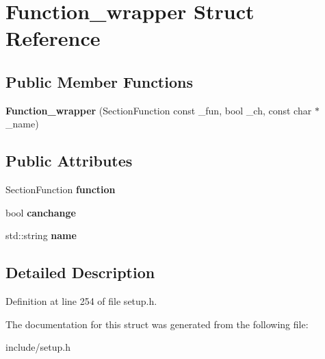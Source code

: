 \hypertarget{structFunction__wrapper}{\section{Function\-\_\-wrapper Struct Reference}
\label{structFunction__wrapper}
}
\subsection*{Public Member Functions}
\begin{DoxyCompactItemize}
\item 
\hypertarget{structFunction__wrapper_a42e855bf8f4ff2cdb3b3fc61982a0e2a}{{\bfseries Function\-\_\-wrapper} (Section\-Function const \-\_\-fun, bool \-\_\-ch, const char $\ast$\-\_\-name)}\label{structFunction__wrapper_a42e855bf8f4ff2cdb3b3fc61982a0e2a}

\end{DoxyCompactItemize}
\subsection*{Public Attributes}
\begin{DoxyCompactItemize}
\item 
\hypertarget{structFunction__wrapper_a37c15a5a48deb464bfbcf0ac2aeed1f4}{Section\-Function {\bfseries function}}\label{structFunction__wrapper_a37c15a5a48deb464bfbcf0ac2aeed1f4}

\item 
\hypertarget{structFunction__wrapper_a07ef638dcc9ab91a2649aeebf09685a6}{bool {\bfseries canchange}}\label{structFunction__wrapper_a07ef638dcc9ab91a2649aeebf09685a6}

\item 
\hypertarget{structFunction__wrapper_a5272f1f398f64bf611d1b6d3fd8848cb}{std\-::string {\bfseries name}}\label{structFunction__wrapper_a5272f1f398f64bf611d1b6d3fd8848cb}

\end{DoxyCompactItemize}


\subsection{Detailed Description}


Definition at line 254 of file setup.\-h.



The documentation for this struct was generated from the following file\-:\begin{DoxyCompactItemize}
\item 
include/setup.\-h\end{DoxyCompactItemize}
